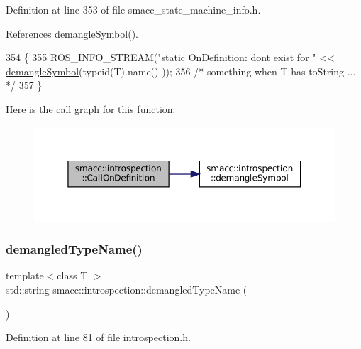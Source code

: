 Definition at line 353 of file smacc\+\_\+state\+\_\+machine\+\_\+info.\+h.



References demangle\+Symbol().


\begin{DoxyCode}
354 \{
355     ROS\_INFO\_STREAM(\textcolor{stringliteral}{"static OnDefinition: dont exist for "} << \hyperlink{namespacesmacc_1_1introspection_a2f495108db3e57604d8d3ff5ef030302}{demangleSymbol}(\textcolor{keyword}{typeid}(T).name()
      ));
356     \textcolor{comment}{/* something when T has toString ... */}
357 \}
\end{DoxyCode}
Here is the call graph for this function\+:
\nopagebreak
\begin{figure}[H]
\begin{center}
\leavevmode
\includegraphics[width=350pt]{namespacesmacc_1_1introspection_a8cfcfc9c8896a6ff4bf22dbce6ecf838_cgraph}
\end{center}
\end{figure}
\mbox{\label{namespacesmacc_1_1introspection_af1b3277706c3299b589c3fa801169286}} 
\subsubsection{\texorpdfstring{demangled\+Type\+Name()}{demangledTypeName()}}
{\footnotesize\ttfamily template$<$class T $>$ \\
std\+::string smacc\+::introspection\+::demangled\+Type\+Name (\begin{DoxyParamCaption}{ }\end{DoxyParamCaption})\hspace{0.3cm}{\ttfamily [inline]}}



Definition at line 81 of file introspection.\+h.



